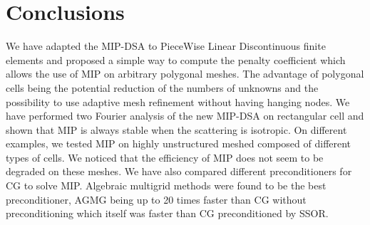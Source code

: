 \section{Conclusions} \label{sec_conc}
We have adapted the MIP-DSA to PieceWise Linear Discontinuous finite elements
and proposed a simple way to compute the penalty coefficient which allows the
use of MIP on arbitrary polygonal meshes. The advantage of polygonal cells 
being the potential reduction 
of the numbers of unknowns and the possibility to use adaptive mesh refinement 
without having hanging nodes. We have performed two Fourier analysis of the
new MIP-DSA on rectangular cell and shown that MIP is always stable when the
scattering is isotropic. On different examples, we tested MIP on highly
unstructured meshed composed of different types of cells. We noticed that the
efficiency of MIP does not seem to be degraded on these meshes. We have also
compared different preconditioners for CG to solve MIP. Algebraic multigrid
methods were found to be the best preconditioner, AGMG being up to 20 times
faster than CG without preconditioning which itself was faster than CG
preconditioned by SSOR.

